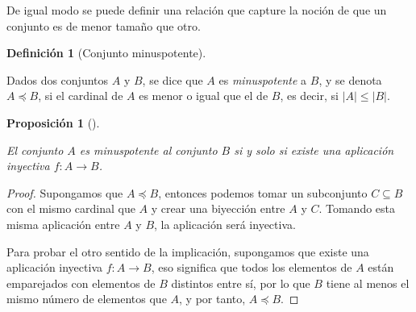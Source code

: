 \documentclass[
  a4paper,
]{scrreport}
\theoremstyle{definition}
\theoremstyle{plain}
\theoremstyle{definition}
\newtheorem{definition}{Definición}[chapter]
\theoremstyle{definition}
\theoremstyle{plain}
\theoremstyle{plain}
\newtheorem{proposition}{Proposición}[chapter]
\theoremstyle{remark}
\begin{document}
De igual modo se puede definir una relación que capture la noción de que
un conjunto es de menor tamaño que otro.

\begin{definition}[Conjunto
minuspotente]\protect\hypertarget{def-conjuntos-minuspotentes}{}\label{def-conjuntos-minuspotentes}

Dados dos conjuntos \(A\) y \(B\), se dice que \(A\) es
\emph{minuspotente} a \(B\), y se denota \(A\preceq B\), si el cardinal
de \(A\) es menor o igual que el de \(B\), es decir, si
\(|A| \leq |B|\).

\end{definition}

\begin{proposition}[]\protect\hypertarget{prp-inyeccion-conjuntos-minuspotentes}{}\label{prp-inyeccion-conjuntos-minuspotentes}

El conjunto \(A\) es minuspotente al conjunto \(B\) si y solo si existe
una aplicación inyectiva \(f:A\rightarrow B\).

\end{proposition}

\begin{tcolorbox}[enhanced jigsaw, leftrule=.75mm, colbacktitle=quarto-callout-note-color!10!white, toprule=.15mm, opacityback=0, opacitybacktitle=0.6, toptitle=1mm, breakable, bottomtitle=1mm, colframe=quarto-callout-note-color-frame, rightrule=.15mm, titlerule=0mm, title=\textcolor{quarto-callout-note-color}{\faInfo}\hspace{0.5em}{Demostración}, arc=.35mm, left=2mm, bottomrule=.15mm, colback=white, coltitle=black]

\begin{proof}
Supongamos que \(A\preceq B\), entonces podemos tomar un subconjunto
\(C\subseteq B\) con el mismo cardinal que \(A\) y crear una biyección
entre \(A\) y \(C\). Tomando esta misma aplicación entre \(A\) y \(B\),
la aplicación será inyectiva.

Para probar el otro sentido de la implicación, supongamos que existe una
aplicación inyectiva \(f:A\longrightarrow B\), eso significa que todos
los elementos de \(A\) están emparejados con elementos de \(B\)
distintos entre sí, por lo que \(B\) tiene al menos el mismo número de
elementos que \(A\), y por tanto, \(A\preceq B\).
\end{proof}

\end{tcolorbox}
\end{document}
